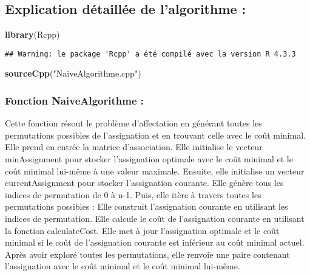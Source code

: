 \documentclass[
]{article}
\newenvironment{Shaded}{\begin{snugshade}}{\end{snugshade}}
\newcommand{\FunctionTok}[1]{\textcolor[rgb]{0.13,0.29,0.53}{\textbf{#1}}}
\newcommand{\NormalTok}[1]{#1}
\newcommand{\StringTok}[1]{\textcolor[rgb]{0.31,0.60,0.02}{#1}}
\begin{document}
\hypertarget{explication-duxe9tailluxe9e-de-lalgorithme}{%
\subsection{Explication détaillée de l'algorithme
:}\label{explication-duxe9tailluxe9e-de-lalgorithme}}

\begin{Shaded}
\begin{Highlighting}[]
\FunctionTok{library}\NormalTok{(Rcpp)}
\end{Highlighting}
\end{Shaded}

\begin{verbatim}
## Warning: le package 'Rcpp' a été compilé avec la version R 4.3.3
\end{verbatim}

\begin{Shaded}
\begin{Highlighting}[]
\FunctionTok{sourceCpp}\NormalTok{(}\StringTok{"NaiveAlgorithme.cpp"}\NormalTok{)}
\end{Highlighting}
\end{Shaded}

\hypertarget{fonction-naivealgorithme}{%
\subsubsection{Fonction NaiveAlgorithme
:}\label{fonction-naivealgorithme}}

Cette fonction résout le problème d'affectation en générant toutes les
permutations possibles de l'assignation et en trouvant celle avec le
coût minimal. Elle prend en entrée la matrice d'association. Elle
initialise le vecteur minAssignment pour stocker l'assignation optimale
avec le coût minimal et le coût minimal lui-même à une valeur maximale.
Ensuite, elle initialise un vecteur currentAssignment pour stocker
l'assignation courante. Elle génère tous les indices de permutation de 0
à n-1. Puis, elle itère à travers toutes les permutations possibles :
Elle construit l'assignation courante en utilisant les indices de
permutation. Elle calcule le coût de l'assignation courante en utilisant
la fonction calculateCost. Elle met à jour l'assignation optimale et le
coût minimal si le coût de l'assignation courante est inférieur au coût
minimal actuel. Après avoir exploré toutes les permutations, elle
renvoie une paire contenant l'assignation avec le coût minimal et le
coût minimal lui-même.
\end{document}
